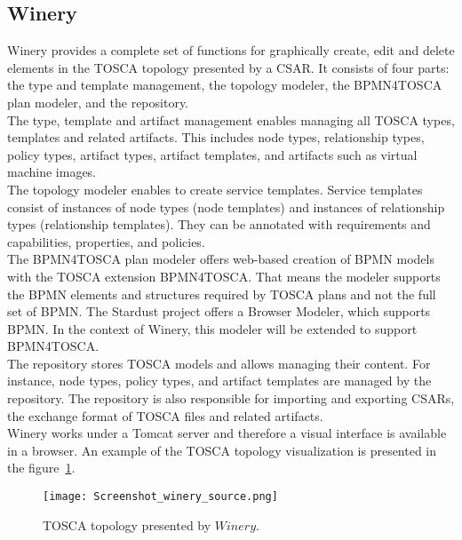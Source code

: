 \subsection*{Winery}\label{subs:wine}\label{tool:winery}
Winery provides a complete set of functions for graphically create, edit and delete elements in the TOSCA topology presented by a CSAR. 
It consists of four parts: the type and template management, the topology modeler, the BPMN4TOSCA plan modeler, and the repository.\\
The type, template and artifact management enables managing all TOSCA types, templates and related artifacts. 
This includes node types, relationship types, policy types, artifact types, artifact templates, and artifacts such as virtual machine images.\\
The topology modeler enables to create service templates. 
Service templates consist of instances of node types (node templates) and instances of relationship types (relationship templates). 
They can be annotated with requirements and capabilities, properties, and policies.\\
The BPMN4TOSCA plan modeler offers web-based creation of BPMN models with the TOSCA extension BPMN4TOSCA. 
That means the modeler supports the BPMN elements and structures required by TOSCA plans and not the full set of BPMN. 
The Stardust project offers a Browser Modeler, which supports BPMN. In the context of Winery, this modeler will be extended to support BPMN4TOSCA.\\
The repository stores TOSCA models and allows managing their content. 
For instance, node types, policy types, and artifact templates are managed by the repository. 
The repository is also responsible for importing and exporting CSARs, the exchange format of TOSCA files and related artifacts.~\cite{winery}\\
Winery works under a Tomcat server and therefore a visual interface is available in a browser. %
An example of the TOSCA topology visualization is presented in the figure~\ref{fig:winery_source}.
\begin{figure}[ht]   
\centering
\texttt{[image: Screenshot\_winery\_source.png]}
\caption{TOSCA topology presented by $Winery$.}
\label{fig:winery_source}
\end{figure}



